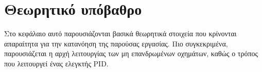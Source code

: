 \chapter{Θεωρητικό υπόβαθρο}
\label{chapter:theory}

Στο κεφάλαιο αυτό παρουσιάζονται βασικά θεωρητικά στοιχεία που κρίνονται απαραίτητα για την κατανόηση της παρούσας εργασίας. Πιο συγκεκριμένα, παρουσιάζεται η αρχή λειτουργίας των μη επανδρωμένων οχημάτων, καθώς ο τρόπος που λειτουργεί ένας ελεγκτής PID.




